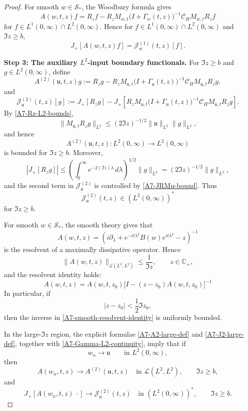 \documentclass[10pt]{article}
\numberwithin{equation}{section}
\numberwithin{theorem}{section}
\begin{document}
\begin{appendix}
\begin{proof}
For smooth \(w\in\mathcal S_*\), the Woodbury formula gives
\[
A(w,t,z)f
=
R_zf
-
R_zM_{w,t}
\bigl(I+\Gamma_w(t,z)\bigr)^{-1}
\mathcal C_HM_{\overline w,t}R_zf
\]
for \(f\in L^1(0,\infty)\cap L^2(0,\infty)\). Hence for \(f\in L^1(0,\infty)\cap L^2(0,\infty)\) and $\Im z \ge b$, 
\[
J_+[A(w,t,z)f]
=
\mathcal J^{(1)}_w(t,z)[f].
\]

\medskip
\noindent
\textbf{Step 3: The auxiliary \(L^2\)-input boundary functionals.}
For \(\Im z\ge b\) and \(g\in L^2(0,\infty)\), define
\begin{equation}
\label{A7-A2-large-def}
A^{(2)}(\mathfrak u,t,z)g
:=
R_zg
-
R_zM_{\mathfrak u,t}
\bigl(I+\Gamma_{\mathfrak u}(t,z)\bigr)^{-1}
\mathcal C_HM_{\overline{\mathfrak u},t}R_zg ,
\end{equation}
and
\begin{equation}
\label{A7-J2-large-def}
\mathcal J^{(2)}_{\mathfrak u}(t,z)[g]
:=
J_+[R_zg]
-
J_+\left[
R_zM_{\mathfrak u,t}
\bigl(I+\Gamma_{\mathfrak u}(t,z)\bigr)^{-1}
\mathcal C_HM_{\overline{\mathfrak u},t}R_zg
\right].
\end{equation}
By \eqref{A7-Rz-L2-bounds},
\[
\|M_{\overline{\mathfrak u},t}R_zg\|_{L^2}
\le
(2\Im z)^{-1/2}\|\mathfrak u\|_{L^2}\|g\|_{L^2},
\]
and hence
\[
A^{(2)}(\mathfrak u,t,z):L^2(0,\infty)\to L^2(0,\infty)
\]
is bounded for \(\Im z\ge b\). Moreover,
\[
|J_+[R_zg]|
\le
\left(\int_0^\infty e^{-2(\Im z)\lambda}\,d\lambda\right)^{1/2}
\|g\|_{L^2}
=
(2\Im z)^{-1/2}\|g\|_{L^2},
\]
and the second term in \(\mathcal J^{(2)}_{\mathfrak u}\) is controlled by
\eqref{A7-JRMu-bound}. Thus
\[
\mathcal J^{(2)}_{\mathfrak u}(t,z)\in (L^2(0,\infty))^*
\]
for \(\Im z\ge b\).

For smooth \(w\in\mathcal S_*\), the smooth theory gives that
\[
A(w,t,z)
=
\left(
i\partial_\lambda+
e^{-it\lambda^2}B(w)e^{it\lambda^2}
-z
\right)^{-1}
\]
is the resolvent of a maximally dissipative operator. Hence
\begin{equation}
\label{A7-smooth-resolvent-bound}
\|A(w,t,z)\|_{\mathcal L(L^2,L^2)}
\le
\frac1{\Im z},
\qquad z\in\mathbb C_+,
\end{equation}
and the resolvent identity holds:
\begin{equation}
\label{A7-smooth-resolvent-identity}
A(w,t,z)
=
A(w,t,z_0)
\bigl[I-(z-z_0)A(w,t,z_0)\bigr]^{-1}
\end{equation}
In particular, if
\[
|z-z_0|<\frac12\Im z_0,
\]
then the inverse in \eqref{A7-smooth-resolvent-identity} is uniformly bounded.

In the large-\(\Im z\) region, the explicit formulae
\eqref{A7-A2-large-def} and \eqref{A7-J2-large-def}, together with
\eqref{A7-Gamma-L2-continuity}, imply that if
\[
w_n\to\mathfrak u
\qquad\text{in }L^2(0,\infty),
\]
then
\begin{equation}
\label{A7-A2-large-conv}
A(w_n,t,z)\to A^{(2)}(\mathfrak u,t,z)
\quad\text{in }\mathcal L(L^2,L^2),
\qquad \Im z\ge b,
\end{equation}
and
\begin{equation}
\label{A7-J2-large-conv}
J_+[A(w_n,t,z)\,\cdot]
\to
\mathcal J^{(2)}_{\mathfrak u}(t,z)
\quad\text{in }(L^2(0,\infty))^*,
\qquad \Im z\ge b.
\end{equation}


\end{proof}
\end{appendix}
\end{document}
